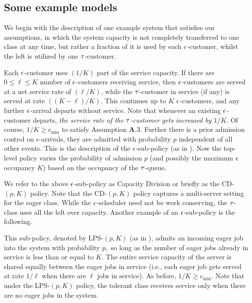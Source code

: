 \subsection{Some example models}
\label{sec:example_models}

We begin with the description of one example system that satisfies our
assumptions, in which the system capacity is not completely
transferred to one class at any time, but rather a fraction of it is
used by each ${ \epsilon }$-customer, whilst the left is utilized by one
${\tau}$-customer.
 
 Each
${ \epsilon }$-customer uses {\small $(1/K)$} part of the service capacity.  If
there are {\small $0 \le \ell \le K$} number of ${ \epsilon }$-customers
receiving service, then ${ \epsilon }$-customers are served at a net service
rate of {\small $({\ell}/{K})$}, while the ${\tau}$-customer in service
(if any) is served at rate {\small $((K-\ell)/K)$}. This continues up
to {\small $K$} ${ \epsilon }$-customers, and any further ${ \epsilon }$-arrival departs
without service. Note that whenever an existing ${ \epsilon }$-customer departs,
{\it the service rate of the ${\tau}$-customer gets increased by {\small
    $1/K$}}. Of course, $1/K \geq c_{\min}$ to satisfy Assumption
\textbf{A}.3. Further there is a prior admission control on
$\epsilon$-arrivals, they are admitted with probability $p$
independent of all other events.  This is the description of the
${ \epsilon }$-sub-policy (as in \cite{Value,ANOR}). Now the top-level policy
varies the probability of admission $p$ (and possibly the maximum ${ \epsilon }$
occupancy $K$) based on the occupancy of the ${\tau}$-queue.
 
We refer to the above ${ \epsilon }$-sub-policy as Capacity Division or briefly
as the CD-$(p,K)$ policy.  Note that the
CD-$(p,K)$ policy captures a multi-server setting for the eager class.
While the ${ \epsilon }$-scheduler need not be work conserving, the ${\tau}$-class
uses all the left over capacity. %
Another example of an ${ \epsilon }$-sub-policy is the following.
    
 This
sub-policy, denoted by LPS-$(p,K)$ (as in \cite{Value,ANOR}), admits
an incoming eager job into the system with probability $p,$ so long as
the number of eager jobs already in service is less than or equal to
$K.$ The entire service capacity of the server is shared equally
between the eager jobs in service (i.e., each eager job gets served at
rate $1/\ell$ when there are $\ell$ jobs in service). As before,
$1/K \geq c_{\min}.$ Note that under the LPS-$(p,K)$ policy, the
tolerant class receives service only when there are no eager jobs in
the system.


